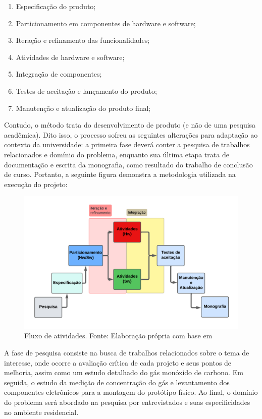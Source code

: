 \begin{enumerate}
    \item Especificação do produto;
    \item Particionamento em componentes de hardware e software;
    \item Iteração e refinamento das funcionalidades;
    \item Atividades de hardware e software;
    \item Integração de componentes;
    \item Testes de aceitação e lançamento do produto;
    \item Manutenção e atualização do produto final;
\end{enumerate}

Contudo, o método trata do desenvolvimento de produto (e não de uma pesquisa acadêmica). Dito isso, o processo sofreu as seguintes alterações para adaptação ao contexto da universidade: a primeira fase deverá conter a pesquisa de trabalhos relacionados e domínio do problema, enquanto sua última etapa trata de documentação e escrita da monografia, como resultado do trabalho de conclusão de curso. Portanto, a seguinte figura demonstra a metodologia utilizada na execução do projeto: 

\begin{figure}[ht]
\centering
\includegraphics[width=.75\textwidth]{img/diagrama-metodologia.png}
\caption{Fluxo de atividades. Fonte: Elaboração própria com base  em\cite{system-design-IOT}}\label{figMetodologia}
\end{figure}

A fase de pesquisa consiste na busca de trabalhos relacionados sobre o tema de interesse, onde ocorre a avaliação crítica de cada projeto e seus pontos de melhoria, assim como um estudo detalhado do gás monóxido de carbono. Em seguida, o estudo da medição de concentração do gás e levantamento dos componentes eletrônicos para a montagem do protótipo físico. Ao final, o domínio do problema será abordado na pesquisa por entrevistados e suas especificidades no ambiente residencial. 

